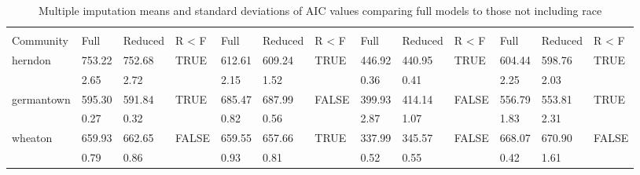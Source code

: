 % 
\begin{sidewaystable}[ht]
\centering
\caption{Multiple imputation means and standard deviations of AIC values comparing full models to those not including race} 
\label{tab:aics}
\begin{tabular}{lR{5.5em}R{5.5em}R{5.5em}R{5.5em}R{5.5em}R{5.5em}R{5.5em}R{5.5em}R{5.5em}R{5.5em}R{5.5em}R{5.5em}}
  \toprule
&  &  &  &  \\
Community & Full & Reduced & R < F & Full & Reduced & R < F & Full & Reduced & R < F & Full & Reduced & R < F \\ 
  \midrule
herndon & 753.22 & 752.68 & TRUE & 612.61 & 609.24 & TRUE & 446.92 & 440.95 & TRUE & 604.44 & 598.76 & TRUE \\ 
   & 2.65 & 2.72 &  & 2.15 & 1.52 &  & 0.36 & 0.41 &  & 2.25 & 2.03 &  \\ 
  germantown & 595.30 & 591.84 & TRUE & 685.47 & 687.99 & FALSE & 399.93 & 414.14 & FALSE & 556.79 & 553.81 & TRUE \\ 
   & 0.27 & 0.32 &  & 0.82 & 0.56 &  & 2.87 & 1.07 &  & 1.83 & 2.31 &  \\ 
  wheaton & 659.93 & 662.65 & FALSE & 659.55 & 657.66 & TRUE & 337.99 & 345.57 & FALSE & 668.07 & 670.90 & FALSE \\ 
   & 0.79 & 0.86 &  & 0.93 & 0.81 &  & 0.52 & 0.55 &  & 0.42 & 1.61 &  \\ 
   \bottomrule
\end{tabular}
\end{sidewaystable}

